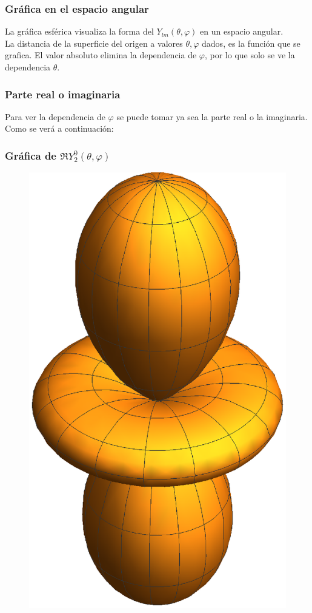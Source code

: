 \documentclass[12pt]{beamer}
\begin{document}
\begin{frame}
\frametitle{Gráfica en el espacio angular}
La gráfica esférica visualiza la forma del $Y_{lm}(\theta, \varphi)$ en un espacio angular.
\\
\bigskip
\pause
La distancia de la superficie del origen a valores $\theta, \varphi$ dados, es la función que se grafica. \pause El valor absoluto elimina la dependencia de $\varphi$, por lo que solo se ve la dependencia $\theta$.
\end{frame}
\begin{frame}
\frametitle{Parte real o imaginaria}
Para ver la dependencia de $\varphi$ se puede tomar ya sea la parte real o la imaginaria.
\\
\bigskip
\pause
Como se verá a continuación:
\end{frame}
\begin{frame}
\frametitle{Gráfica de $\Re{Y_{2}^{0} (\theta, \varphi)}$}
\begin{figure}
    \centering
    \includegraphics[scale=0.45]{Imagenes/AE_Re_20.eps}
\end{figure}
\end{frame}
\end{document}
